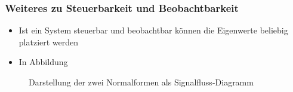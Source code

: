 \subsubsection{Weiteres zu Steuerbarkeit und Beobachtbarkeit}
\begin{itemize}
	\item Ist ein System steuerbar und beobachtbar können die Eigenwerte beliebig platziert werden
	\item In Abbildung 
\end{itemize}
\begin{figure}[!ht]
	\hfill
	\caption{Darstellung der zwei Normalformen als Signalfluss-Diagramm}
	\label{fig:Mitdrehende_spenderspule}
\end{figure}
\newpage
